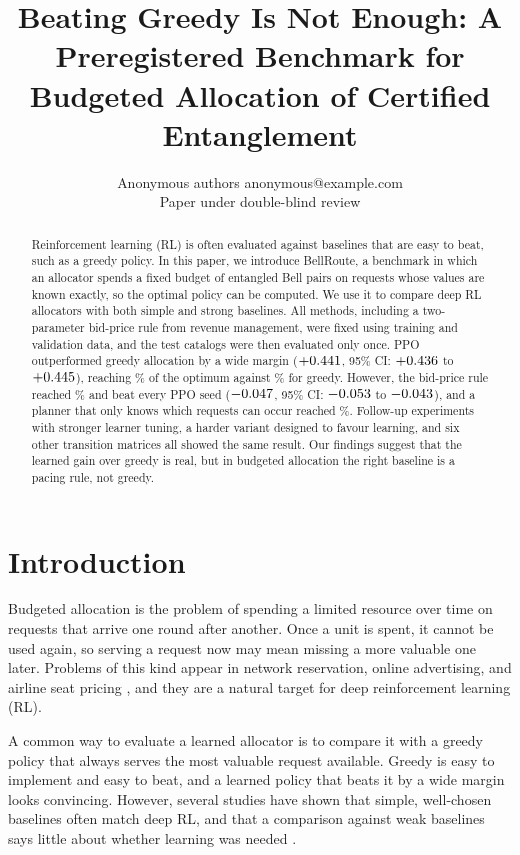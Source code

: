 \documentclass[10pt]{article}
\title{Beating Greedy Is Not Enough: A Preregistered Benchmark for Budgeted Allocation of Certified Entanglement}
\author{\name Anonymous authors \email anonymous@example.com \\
\addr Paper under double-blind review}
\begin{document}
\maketitle

\begin{abstract}
Reinforcement learning (RL) is often evaluated against baselines that are easy to beat, such as a greedy policy. In this paper, we introduce BellRoute, a benchmark in which an allocator spends a fixed budget of entangled Bell pairs on requests whose values are known exactly, so the optimal policy can be computed. We use it to compare deep RL allocators with both simple and strong baselines. All methods, including a two-parameter bid-price rule from revenue management, were fixed using training and validation data, and the test catalogs were then evaluated only once. PPO outperformed greedy allocation by a wide margin ($+0.441$, 95\% CI: $+0.436$ to $+0.445$), reaching \cfFracPpo\% of the optimum against \cfFracGreedy\% for greedy. However, the bid-price rule reached \cfFracBp\% and beat every PPO seed ($-0.047$, 95\% CI: $-0.053$ to $-0.043$), and a planner that only knows which requests can occur reached \cfFracCe\%. Follow-up experiments with stronger learner tuning, a harder variant designed to favour learning, and six other transition matrices all showed the same result. Our findings suggest that the learned gain over greedy is real, but in budgeted allocation the right baseline is a pacing rule, not greedy.
\end{abstract}

\section{Introduction}\label{sec:intro}

Budgeted allocation is the problem of spending a limited resource over time on requests that arrive one round after another. Once a unit is spent, it cannot be used again, so serving a request now may mean missing a more valuable one later. Problems of this kind appear in network reservation, online advertising, and airline seat pricing \citep{talluri2004theory,feldman2009online}, and they are a natural target for deep reinforcement learning (RL).

A common way to evaluate a learned allocator is to compare it with a greedy policy that always serves the most valuable request available. Greedy is easy to implement and easy to beat, and a learned policy that beats it by a wide margin looks convincing. However, several studies have shown that simple, well-chosen baselines often match deep RL, and that a comparison against weak baselines says little about whether learning was needed \citep{henderson2018deep,rajeswaran2017towards,mania2018simple,patterson2024empirical}.
\end{document}
